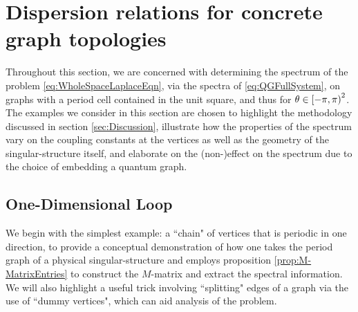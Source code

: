 \section{Dispersion relations for concrete graph topologies} \label{sec:Examples}
Throughout this section, we are concerned with determining the spectrum of the problem \eqref{eq:WholeSpaceLaplaceEqn}, via the spectra of \eqref{eq:QGFullSystem}, on graphs with a period cell contained in the unit square, and thus for $\theta\in\left[-\pi,\pi\right)^2$.
The examples we consider in this section are chosen to highlight the methodology discussed in section \ref{sec:Discussion}, illustrate how the properties of the spectrum vary on the coupling constants at the vertices as well as the geometry of the singular-structure itself, and elaborate on the (non-)effect on the spectrum due to the choice of embedding a quantum graph. 

\subsection{One-Dimensional Loop} \label{ssec:Example1DLoop}
We begin with the simplest example: a ``chain" of vertices that is periodic in one direction, to provide a conceptual demonstration of how one takes the period graph of a physical singular-structure and employs proposition \ref{prop:M-MatrixEntries} to construct the $M$-matrix and extract the spectral information.
We will also highlight a useful trick involving ``splitting" edges of a graph via the use of ``dummy vertices", which can aid analysis of the problem.


